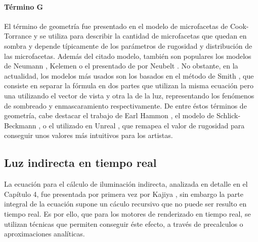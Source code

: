             \paragraph*{\hspace*{1.5em}T\'ermino G}
                El t\'ermino de geometr\'ia fue presentado en el modelo de microfacetas de Cook-Torrance \autocite{cooktorrance}
                y se utiliza para describir la cantidad de microfacetas que quedan en sombra y depende t\'ipicamente de los par\'ametros
                de rugosidad y distribuci\'on de las microfacetas. Adem\'as del citado modelo, tambi\'en son populares los modelos de
                Neumann \autocite{neumann}, Kelemen \autocite{kelemen} o el presentado de por Neubelt \autocite{theordertalk}. No
                obstante, en la actualidad, los modelos m\'as usados son los basados en el m\'etodo de Smith \autocite{smith}, que
                consiste en separar la f\'ormula en dos partes que utilizan la misma ecuaci\'on pero una utilizando el vector de vista
                y otra la de la luz, representando los fen\'omenos de sombreado y enmascaramiento respectivamente. De entre \'estos t\'erminos
                de geometr\'ia, cabe destacar el trabajo de Earl Hammon \autocite{earlhammon}, el modelo de Schlick-Beckmann \autocite{schlick},
                o el utilizado en Unreal \autocite{unreal}, que remapea el valor de rugosidad para conseguir unos valores m\'as intuitivos para
                los artistas.
                
        \subsection{Luz indirecta en tiempo real}
        La ecuaci\'on para el c\'alculo de iluminaci\'on indirecta, analizada en detalle en el Cap\'itulo 4, fue presentada por primera vez
        por Kajiya \autocite{kajiya}, sin embargo la parte integral de la ecuaci\'on supone un c\'aculo recursivo que no puede ser resulto
        en tiempo real. Es por ello, que para los motores de renderizado en tiempo real, se utilizan t\'ecnicas que permiten conseguir
        \'este efecto, a trav\'es de precalculos o aproximaciones anal\'iticas.

